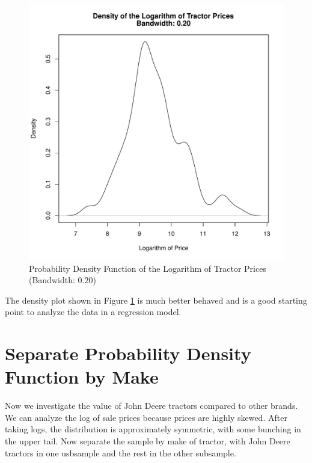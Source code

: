 \documentclass[11pt]{book}
\begin{document}
\begin{figure}[h!]
  \centering
  \includegraphics[scale = 0.5, keepaspectratio=true]{../Figures/density_log_saleprice_bw020}
  \caption{Probability Density Function of the Logarithm of Tractor Prices (Bandwidth: $0.20$)} \label{fig:density_log_saleprice_bw020}
\end{figure}


The density plot
shown in Figure \ref{fig:density_log_saleprice_bw020}
is much better behaved and is a good starting point to
analyze the data in a regression model.



\clearpage
\pagebreak
\section{Separate Probability Density Function by Make}

Now we investigate the value of John Deere tractors
compared to other brands.
We can analyze the log of sale prices because 
prices are highly skewed.
After taking logs, the distribution is
approximately symmetric, with some bunching in the
upper tail.
Now separate the sample by make of tractor, 
with John Deere tractors in one usbsample 
and the rest in the other subsample. 
\end{document}
